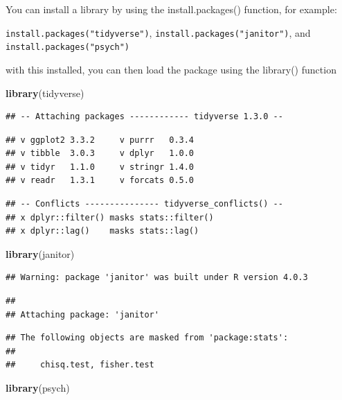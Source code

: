 \documentclass[
]{book}
\newenvironment{Shaded}{\begin{snugshade}}{\end{snugshade}}
\newcommand{\KeywordTok}[1]{\textcolor[rgb]{0.13,0.29,0.53}{\textbf{#1}}}
\newcommand{\NormalTok}[1]{#1}
\begin{document}
You can install a library by using the install.packages() function, for example:

\texttt{install.packages("tidyverse")}, \texttt{install.packages("janitor")}, and \texttt{install.packages("psych")}

with this installed, you can then load the package using the library() function

\begin{Shaded}
\begin{Highlighting}[]
\KeywordTok{library}\NormalTok{(tidyverse)}
\end{Highlighting}
\end{Shaded}

\begin{verbatim}
## -- Attaching packages ------------ tidyverse 1.3.0 --
\end{verbatim}

\begin{verbatim}
## v ggplot2 3.3.2     v purrr   0.3.4
## v tibble  3.0.3     v dplyr   1.0.0
## v tidyr   1.1.0     v stringr 1.4.0
## v readr   1.3.1     v forcats 0.5.0
\end{verbatim}

\begin{verbatim}
## -- Conflicts --------------- tidyverse_conflicts() --
## x dplyr::filter() masks stats::filter()
## x dplyr::lag()    masks stats::lag()
\end{verbatim}

\begin{Shaded}
\begin{Highlighting}[]
\KeywordTok{library}\NormalTok{(janitor)}
\end{Highlighting}
\end{Shaded}

\begin{verbatim}
## Warning: package 'janitor' was built under R version 4.0.3
\end{verbatim}

\begin{verbatim}
## 
## Attaching package: 'janitor'
\end{verbatim}

\begin{verbatim}
## The following objects are masked from 'package:stats':
## 
##     chisq.test, fisher.test
\end{verbatim}

\begin{Shaded}
\begin{Highlighting}[]
\KeywordTok{library}\NormalTok{(psych)}
\end{Highlighting}
\end{Shaded}
\end{document}
